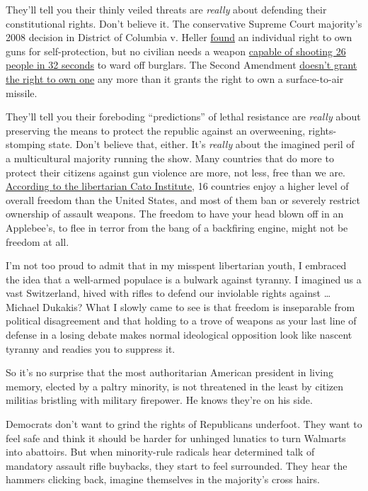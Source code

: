 They'll tell you their thinly veiled threats are \emph{really} about
defending their constitutional rights. Don't believe it. The
conservative Supreme Court majority's 2008 decision in District of
Columbia v. Heller \href{https://www.oyez.org/cases/2007/07-290}{found}
an individual right to own guns for self-protection, but no civilian
needs a weapon
\href{https://www.nytimes3xbfgragh.onion/2019/08/13/us/dayton-shooter-video-timeline.html}{capable
of shooting 26 people in 32 seconds} to ward off burglars. The Second
Amendment
\href{https://beta.washingtonpost.com/news/morning-mix/wp/2018/02/22/does-the-second-amendment-really-protect-assault-weapons-four-courts-have-said-no/}{doesn't
grant the right to own one} any more than it grants the right to own a
surface-to-air missile.

They'll tell you their foreboding ``predictions'' of lethal resistance
are \emph{really} about preserving the means to protect the republic
against an overweening, rights-stomping state. Don't believe that,
either. It's \emph{really} about the imagined peril of a multicultural
majority running the show. Many countries that do more to protect their
citizens against gun violence are more, not less, free than we are.
\href{https://object.cato.org/sites/cato.org/files/human-freedom-index-files/human-freedom-index-2018-revised.pdf}{According
to the libertarian Cato Institute}, 16 countries enjoy a higher level of
overall freedom than the United States, and most of them ban or severely
restrict ownership of assault weapons. The freedom to have your head
blown off in an Applebee's, to flee in terror from the bang of a
backfiring engine, might not be freedom at all.

I'm not too proud to admit that in my misspent libertarian youth, I
embraced the idea that a well-armed populace is a bulwark against
tyranny. I imagined us a vast Switzerland, hived with rifles to defend
our inviolable rights against \ldots{} Michael Dukakis? What I slowly
came to see is that freedom is inseparable from political disagreement
and that holding to a trove of weapons as your last line of defense in a
losing debate makes normal ideological opposition look like nascent
tyranny and readies you to suppress it.

So it's no surprise that the most authoritarian American president in
living memory, elected by a paltry minority, is not threatened in the
least by citizen militias bristling with military firepower. He knows
they're on his side.

Democrats don't want to grind the rights of Republicans underfoot. They
want to feel safe and think it should be harder for unhinged lunatics to
turn Walmarts into abattoirs. But when minority-rule radicals hear
determined talk of mandatory assault rifle buybacks, they start to feel
surrounded. They hear the hammers clicking back, imagine themselves in
the majority's cross hairs.

